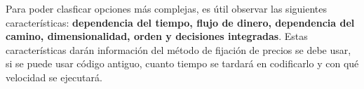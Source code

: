 
Para poder clasficar opciones más complejas, es útil observar las siguientes características: \textbf{dependencia del tiempo, flujo de dinero, dependencia del camino, dimensionalidad, orden y decisiones integradas}. Estas características darán información del método de fijación de precios se debe usar, si se puede usar código antiguo, cuanto tiempo se tardará en codificarlo y con qué velocidad se ejecutará.

















